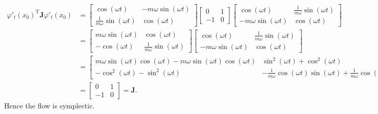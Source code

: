 \documentclass{report}
\begin{document}
\begin{align*}
	\varphi'_t(x_0)^\mathrm{T} \mathbf{J} \varphi'_t(x_0) &= \begin{bmatrix}
		\cos(\omega t) & -m\omega \sin(\omega t) \\
		\frac{1}{m\omega} \sin(\omega t) & \cos(\omega t)
	\end{bmatrix} \begin{bmatrix}
		0 & 1 \\
		-1 & 0
	\end{bmatrix} \begin{bmatrix}
		\cos(\omega t) & \frac{1}{m\omega} \sin(\omega t) \\
		-m\omega \sin(\omega t) & \cos(\omega t)
	\end{bmatrix} \\
	&= \begin{bmatrix}
		m \omega \sin(\omega t) & \cos(\omega t) \\
		-\cos(\omega t) & \frac{1}{m \omega} \sin(\omega t)
	\end{bmatrix} \begin{bmatrix}
		\cos(\omega t) & \frac{1}{m\omega} \sin(\omega t) \\
		-m\omega \sin(\omega t) & \cos(\omega t)
	\end{bmatrix} \\
	&= \begin{bmatrix}
		m \omega \sin(\omega t) \cos(\omega t) - m \omega \sin(\omega t) \cos(\omega t)  & \sin^2(\omega t) + \cos^2(\omega t) \\
		-\cos^2(\omega t) - \sin^2(\omega t) & -\frac{1}{m\omega}\cos(\omega t)\sin(\omega t) + \frac{1}{m \omega}\cos(\omega t)\sin(\omega t)
	\end{bmatrix} \\
	&= \begin{bmatrix}
		0 & 1 \\
		-1 & 0
	\end{bmatrix} = \mathbf{J}.
\end{align*}
Hence the flow is symplectic.
\end{document}
